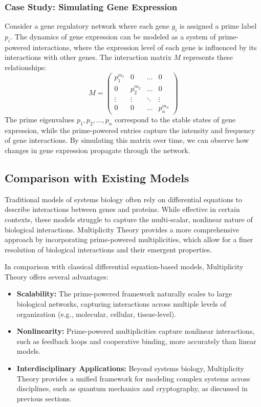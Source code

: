\documentclass[%
 preprint, linenumbers,
 amsmath,amssymb,
 aps, physrev,
]{revtex4-2}
\begin{document}
\subsubsection{Case Study: Simulating Gene Expression}
Consider a gene regulatory network where each gene \( g_i \) is assigned a prime label \( p_i \). The dynamics of gene expression can be modeled as a system of prime-powered interactions, where the expression level of each gene is influenced by its interactions with other genes. The interaction matrix \( M \) represents these relationships:
\[
M = \begin{pmatrix} p_1^{m_1} & 0 & \dots & 0 \\ 0 & p_2^{m_2} & \dots & 0 \\ \vdots & \vdots & \ddots & \vdots \\ 0 & 0 & \dots & p_n^{m_n} \end{pmatrix}
\]
The prime eigenvalues \( p_1, p_2, \dots, p_n \) correspond to the stable states of gene expression, while the prime-powered entries capture the intensity and frequency of gene interactions. By simulating this matrix over time, we can observe how changes in gene expression propagate through the network.

\subsection{Comparison with Existing Models}
Traditional models of systems biology often rely on differential equations to describe interactions between genes and proteins. While effective in certain contexts, these models struggle to capture the multi-scalar, nonlinear nature of biological interactions. Multiplicity Theory provides a more comprehensive approach by incorporating prime-powered multiplicities, which allow for a finer resolution of biological interactions and their emergent properties.

In comparison with classical differential equation-based models, Multiplicity Theory offers several advantages:
\begin{itemize}
    \item \textbf{Scalability:} The prime-powered framework naturally scales to large biological networks, capturing interactions across multiple levels of organization (e.g., molecular, cellular, tissue-level).
    \item \textbf{Nonlinearity:} Prime-powered multiplicities capture nonlinear interactions, such as feedback loops and cooperative binding, more accurately than linear models.
    \item \textbf{Interdisciplinary Applications:} Beyond systems biology, Multiplicity Theory provides a unified framework for modeling complex systems across disciplines, such as quantum mechanics and cryptography, as discussed in previous sections.
\end{itemize}
\end{document}
